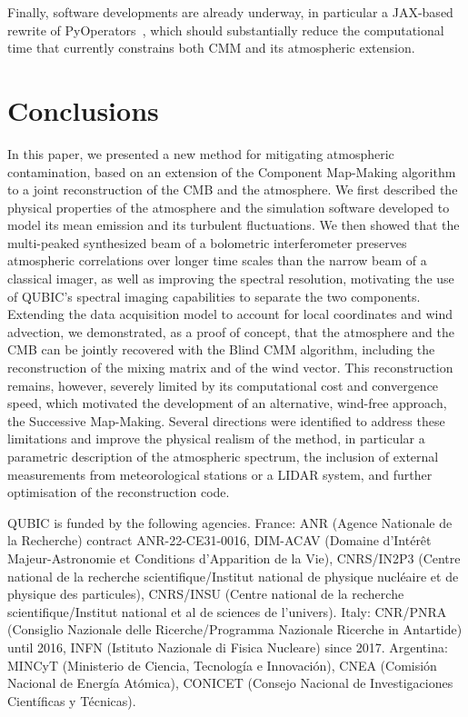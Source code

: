 \documentclass[a4paper,11pt]{article}
\begin{document}
Finally, software developments are already underway, in particular a JAX-based rewrite of PyOperators~\cite{PyOperators}, which should substantially reduce the computational time that currently constrains both CMM and its atmospheric extension.

\section{Conclusions}
\label{sec:conclusions}

In this paper, we presented a new method for mitigating atmospheric contamination, based on an extension of the Component Map-Making algorithm to a joint reconstruction of the CMB and the atmosphere. We first described the physical properties of the atmosphere and the simulation software developed to model its mean emission and its turbulent fluctuations. We then showed that the multi-peaked synthesized beam of a bolometric interferometer preserves atmospheric correlations over longer time scales than the narrow beam of a classical imager, as well as improving the spectral resolution, motivating the use of QUBIC's spectral imaging capabilities to separate the two components. Extending the data acquisition model to account for local coordinates and wind advection, we demonstrated, as a proof of concept, that the atmosphere and the CMB can be jointly recovered with the Blind CMM algorithm, including the reconstruction of the mixing matrix and of the wind vector. This reconstruction remains, however, severely limited by its computational cost and convergence speed, which motivated the development of an alternative, wind-free approach, the Successive Map-Making. Several directions were identified to address these limitations and improve the physical realism of the method, in particular a parametric description of the atmospheric spectrum, the inclusion of external measurements from meteorological stations or a LIDAR system, and further optimisation of the reconstruction code.

\acknowledgments
QUBIC is funded by the following agencies. France: ANR (Agence Nationale de la
Recherche) contract ANR-22-CE31-0016, DIM-ACAV (Domaine d’Intérêt Majeur-Astronomie et Conditions d’Apparition de la Vie), CNRS/IN2P3 (Centre national de la recherche scientifique/Institut national de physique nucléaire et de physique des particules), CNRS/INSU (Centre national de la recherche scientifique/Institut national et al de sciences de l’univers). Italy: CNR/PNRA (Consiglio Nazionale delle Ricerche/Programma Nazionale Ricerche in
Antartide) until 2016, INFN (Istituto Nazionale di Fisica Nucleare) since 2017.  Argentina: MINCyT (Ministerio de Ciencia, Tecnología e Innovación), CNEA (Comisión Nacional de Energía Atómica), CONICET (Consejo Nacional de Investigaciones Científicas y Técnicas).



\end{document}
